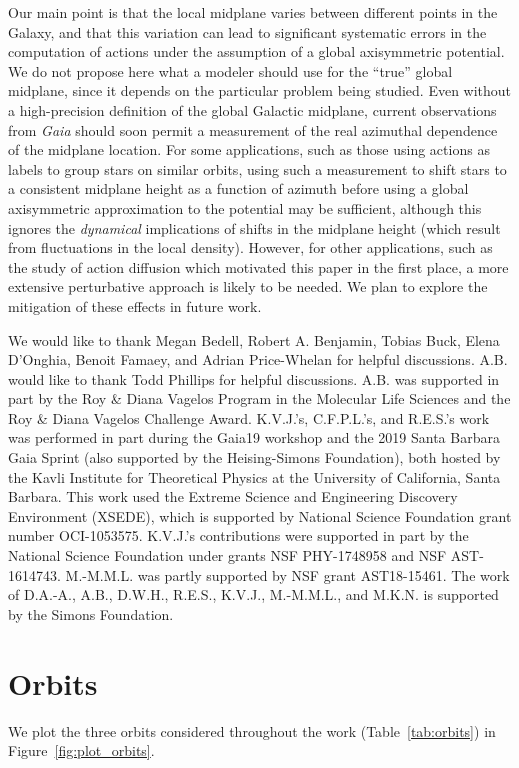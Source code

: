 \documentclass[twocolumn]{aastex62}
\begin{document}
Our main point is that the local midplane varies between different points in
the Galaxy, and that this variation can lead to significant systematic errors
in the computation of actions under the assumption of a global axisymmetric
potential. We do not propose here what a modeler should use for the ``true''
global midplane, since it depends on the particular problem being studied.
Even without a high-precision definition of the global Galactic midplane,
current observations from \textit{Gaia} should soon permit a measurement of the
real azimuthal dependence of the midplane location. For some applications,
such as those using actions as labels to group stars on similar orbits, using
such a measurement to shift stars to a consistent midplane height as a
function of azimuth before using a global axisymmetric approximation to the
potential may be sufficient, although this ignores the \emph{dynamical}
implications of shifts in the midplane height (which result from fluctuations
in the local density). However, for other applications, such as the study of
action diffusion which motivated this paper in the first place, a more
extensive perturbative approach is likely to be needed. We plan to explore the
mitigation of these effects in future work.

\acknowledgments
We would like to thank Megan Bedell, Robert A. Benjamin, Tobias Buck, Elena
D'Onghia, Benoit Famaey, and Adrian Price-Whelan for helpful discussions. A.B.
would like to thank Todd Phillips for helpful discussions. A.B. was supported
in part by the Roy \& Diana Vagelos Program in the Molecular Life Sciences and
the Roy \& Diana Vagelos Challenge Award. K.V.J.'s, C.F.P.L.'s, and R.E.S.'s work was
performed in part during the Gaia19 workshop and the 2019 Santa Barbara Gaia
Sprint (also supported by the Heising-Simons Foundation), both hosted by the
Kavli Institute for Theoretical Physics at the University of California, Santa
Barbara. This work used the Extreme Science and Engineering Discovery
Environment (XSEDE), which is supported by National Science Foundation grant
number OCI-1053575. K.V.J.'s contributions were supported in part by the
National Science Foundation under grants NSF PHY-1748958 and NSF AST-1614743.
M.-M.M.L. was partly supported by NSF grant AST18-15461. The work of D.A.-A.,
A.B., D.W.H., R.E.S., K.V.J., M.-M.M.L., and M.K.N. is supported by the Simons
Foundation.

\appendix
\section{Orbits} \label{app:orbits}
We plot the three orbits considered throughout the work
(Table~\ref{tab:orbits}) in Figure~\ref{fig:plot_orbits}.
\end{document}
